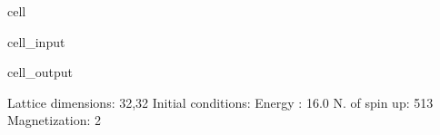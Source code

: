 \documentclass[letterpaper,10pt,english]{jupyterBook}
\begin{document}
\begin{sphinxuseclass}{cell}
\begin{sphinxVerbatimInput}
\begin{sphinxuseclass}{cell_input}
\end{sphinxuseclass}\end{sphinxVerbatimInput}
\begin{sphinxVerbatimOutput}

\begin{sphinxuseclass}{cell_output}
\begin{sphinxVerbatim}[commandchars=\\\{\}]
Lattice dimensions: 32,32
Initial conditions:
Energy       : \PYGZhy{}16.0
N. of spin up: 513
Magnetization: 2
\end{sphinxVerbatim}

\end{sphinxuseclass}\end{sphinxVerbatimOutput}

\end{sphinxuseclass}
\end{document}
